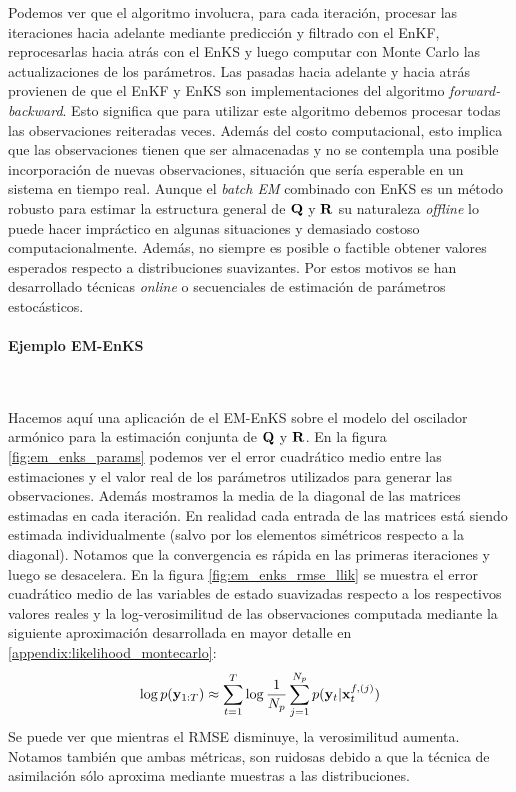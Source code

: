 Podemos ver que el algoritmo involucra, para cada iteración, procesar las iteraciones hacia adelante mediante predicción y filtrado con el EnKF, reprocesarlas hacia atrás con el EnKS y luego computar con Monte Carlo las actualizaciones de los parámetros. Las pasadas hacia adelante y hacia atrás provienen de que el EnKF y EnKS son implementaciones del algoritmo \textit{forward-backward}. Esto significa que para utilizar este algoritmo debemos procesar todas las observaciones reiteradas veces. Además del costo computacional, esto implica que las observaciones tienen que ser almacenadas y no se contempla una posible incorporación de nuevas observaciones, situación que sería esperable en un sistema en tiempo real. Aunque el \textit{batch EM} combinado con EnKS es un método robusto para estimar la estructura general de $\mathbf{Q}$ y $\mathbf{R}$ su naturaleza \textit{offline} lo puede hacer impráctico en algunas situaciones y demasiado costoso computacionalmente. Además, no siempre es posible o factible obtener valores esperados respecto a distribuciones suavizantes. Por estos motivos se han desarrollado técnicas \textit{online} o secuenciales de estimación de parámetros estocásticos. 

\paragraph{Ejemplo EM-EnKS} \

Hacemos aquí una aplicación de el EM-EnKS sobre el modelo del oscilador armónico para la estimación conjunta de $\mathbf{Q}$ y $\mathbf{R}$. En la figura \ref{fig:em_enks_params} podemos ver el error cuadrático medio entre las estimaciones y el valor real de los parámetros utilizados para generar las observaciones. Además mostramos la media de la diagonal de las matrices estimadas en cada iteración. En realidad cada entrada de las matrices está siendo estimada individualmente (salvo por los elementos simétricos respecto a la diagonal). Notamos que la convergencia es rápida en las primeras iteraciones y luego se desacelera. En la figura \ref{fig:em_enks_rmse_llik} se muestra el error cuadrático medio de las variables de estado suavizadas respecto a los respectivos valores reales y la log-verosimilitud de las observaciones computada mediante la siguiente aproximación desarrollada en mayor detalle en \ref{appendix:likelihood_montecarlo}:
\begin{align}
    \log p(\mathbf{y}_{1:T}) \approx \sum_{t=1}^{T} \log \frac{1}{N_p} \sum_{j=1}^{N_p} p(\mathbf{y}_t | \mathbf{x}_t^{f, (j)}) \label{eq:likelihood_montecarlo}
\end{align}
Se puede ver que mientras el RMSE disminuye, la verosimilitud aumenta. Notamos también que ambas métricas, son ruidosas debido a que la técnica de asimilación sólo aproxima mediante muestras a las distribuciones.

